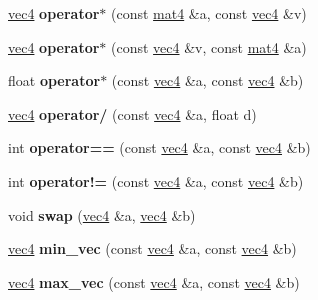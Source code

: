 \begin{DoxyCompactItemize}
\item 
\hypertarget{classvec4_a0252c203e5a77099da7fd04c576ed437}{\hyperlink{classvec4}{vec4} {\bfseries operator$\ast$} (const \hyperlink{classmat4}{mat4} \&a, const \hyperlink{classvec4}{vec4} \&v)}\label{classvec4_a0252c203e5a77099da7fd04c576ed437}

\item 
\hypertarget{classvec4_ab8e4f991ed4a9b63e108d9bce7c80a50}{\hyperlink{classvec4}{vec4} {\bfseries operator$\ast$} (const \hyperlink{classvec4}{vec4} \&v, const \hyperlink{classmat4}{mat4} \&a)}\label{classvec4_ab8e4f991ed4a9b63e108d9bce7c80a50}

\item 
\hypertarget{classvec4_adda90795cc9563711997dc2872ed825b}{float {\bfseries operator$\ast$} (const \hyperlink{classvec4}{vec4} \&a, const \hyperlink{classvec4}{vec4} \&b)}\label{classvec4_adda90795cc9563711997dc2872ed825b}

\item 
\hypertarget{classvec4_aab474ed7114f159e8b96a39fb75a77ed}{\hyperlink{classvec4}{vec4} {\bfseries operator/} (const \hyperlink{classvec4}{vec4} \&a, float d)}\label{classvec4_aab474ed7114f159e8b96a39fb75a77ed}

\item 
\hypertarget{classvec4_a341e4e99a5b48405ff8f6507aa604fa5}{int {\bfseries operator==} (const \hyperlink{classvec4}{vec4} \&a, const \hyperlink{classvec4}{vec4} \&b)}\label{classvec4_a341e4e99a5b48405ff8f6507aa604fa5}

\item 
\hypertarget{classvec4_ab31e1953c47b63ec12ee0765afdde4e5}{int {\bfseries operator!=} (const \hyperlink{classvec4}{vec4} \&a, const \hyperlink{classvec4}{vec4} \&b)}\label{classvec4_ab31e1953c47b63ec12ee0765afdde4e5}

\item 
\hypertarget{classvec4_ad7ca462c6964dec321ad4bbb83e1b343}{void {\bfseries swap} (\hyperlink{classvec4}{vec4} \&a, \hyperlink{classvec4}{vec4} \&b)}\label{classvec4_ad7ca462c6964dec321ad4bbb83e1b343}

\item 
\hypertarget{classvec4_acf259b790c1ece6319533affe38a78d0}{\hyperlink{classvec4}{vec4} {\bfseries min\-\_\-vec} (const \hyperlink{classvec4}{vec4} \&a, const \hyperlink{classvec4}{vec4} \&b)}\label{classvec4_acf259b790c1ece6319533affe38a78d0}

\item 
\hypertarget{classvec4_ac9c9289beff2b97eabba84edbe6cae15}{\hyperlink{classvec4}{vec4} {\bfseries max\-\_\-vec} (const \hyperlink{classvec4}{vec4} \&a, const \hyperlink{classvec4}{vec4} \&b)}\label{classvec4_ac9c9289beff2b97eabba84edbe6cae15}


\end{DoxyCompactItemize}

